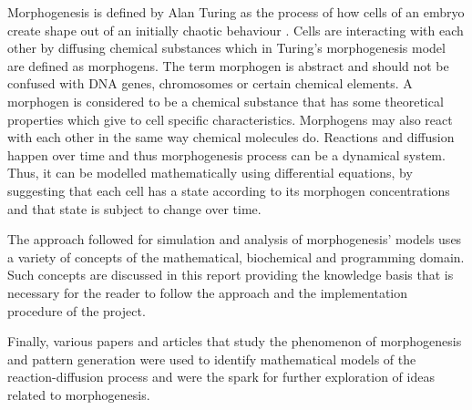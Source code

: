 Morphogenesis is defined by Alan Turing as the process of how cells of an embryo create shape out of an initially chaotic behaviour \cite{turing_chemical_1990}. Cells are interacting with each other by diffusing chemical substances which in Turing's morphogenesis model are defined as morphogens. The term morphogen is abstract and should not be confused with DNA genes, chromosomes or certain chemical elements. 
A morphogen is considered to be a chemical substance that has some theoretical properties which give to cell specific characteristics. Morphogens may also react with each other in the same way chemical molecules do. Reactions and diffusion happen over time and thus morphogenesis process can be a dynamical system.   
Thus, it can be modelled mathematically using differential equations, by suggesting that each cell has a state according to its morphogen concentrations and that state is subject to change over time.

The approach followed for simulation and analysis of morphogenesis' models uses a variety of concepts of the mathematical, biochemical and programming domain. Such concepts are discussed in this report providing the knowledge basis that is necessary for the reader to follow the approach and the implementation procedure of the project.

Finally, various papers and articles \cite{garvie_methodology}\cite{heineike_modeling_2002}\cite{kassam_solving_2003} that study the phenomenon of morphogenesis and pattern generation were used to identify mathematical models of the reaction-diffusion process and were the spark for further exploration of ideas related to morphogenesis. 




